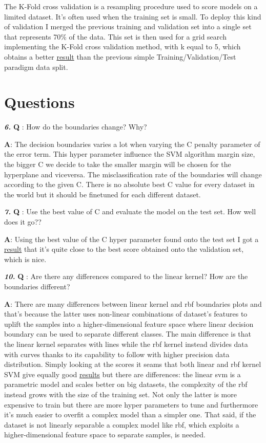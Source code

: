 \documentclass[11pt]{article}
\begin{document}
The K-Fold cross validation is a resampling procedure used to score
models on a limited dataset. It's often used when the training set is
small. To deploy this kind of validation I merged the previous training
and validation set into a single set that represents 70\% of the data.
This set is then used for a grid search implementing the K-Fold cross
validation method, with k equal to 5, which obtains a better
\hyperlink{crossval}{result} than the previous simple Training/Validation/Test
paradigm data split.

\section{Questions }\label{questions}

\textbf{\emph{6.}} \textbf{Q} : How do the boundaries change? Why?

\textbf{A}: The decision boundaries varies a lot when varying the C
penalty parameter of the error term. This hyper parameter influence the
SVM algorithm margin size, the bigger C we decide to take the smaller
margin will be chosen for the hyperplane and viceversa. The
misclassification rate of the boundaries will change according to the
given C. There is no absolute best C value for every dataset in the
world but it should be finetuned for each different dataset.

\textbf{\emph{7.}} \textbf{Q} : Use the best value of C and evaluate the
model on the test set. How well does it go??

\textbf{A}: Using the best value of the C hyper parameter found onto the
test set I got a \hyperlink{linear}{result} that it's quite close to the best
score obtained onto the validation set, which is nice.

\textbf{\emph{10.}} \textbf{Q} : Are there any differences compared to
the linear kernel? How are the boundaries different?

\textbf{A}: There are many differences between linear kernel and rbf
boundaries plots and that's because the latter uses non-linear
combinations of dataset's features to uplift the samples into a
higher-dimensional feature space where linear decision boundary can be
used to separate different classes. The main difference is that the
linear kernel separates with lines while the rbf kernel instead divides
data with curves thanks to its capability to follow with higher
precision data distribution. Simply looking at the scores it seams that
both linear and rbf kernel SVM give equally good \hyperlink{cfinetune}{results}
but there are differences: the linear svm is a parametric model and
scales better on big datasets, the complexity of the rbf instead grows
with the size of the training set. Not only the latter is more expensive
to train but there are more hyper parameters to tune and furthermore
it's much easier to overfit a complex model than a simpler one. That
said, if the dataset is not linearly separable a complex model like rbf,
which exploits a higher-dimensional feature space to separate samples,
is needed.
\end{document}
